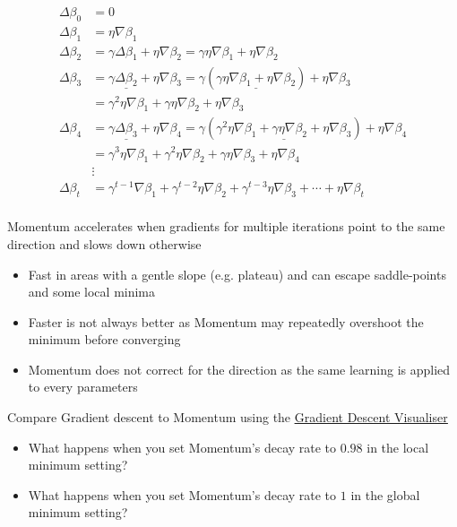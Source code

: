 \documentclass[c]{beamer}
\begin{document}
\begin{frame}{\secsubname}
	\begin{align*}
		\Delta \beta_0 &= 0 \\
		\Delta \beta_1 &= \eta \nabla \beta_1 \\
		\Delta \beta_2 &= \gamma \Delta \beta_1 + \eta \nabla \beta_2 = \gamma \eta \nabla \beta_1 + \eta \nabla \beta_2 \\
		\Delta \beta_3 
		&= \gamma \underline{\Delta \beta_2} + \eta \nabla \beta_3
		= \gamma \left(\underline{\gamma \eta \nabla \beta_1 + \eta \nabla \beta_2}\right) + \eta \nabla \beta_3 \\
		&= \gamma^2 \eta \nabla \beta_1 + \gamma \eta \nabla \beta_2 + \eta \nabla \beta_3 \\
		\Delta \beta_4 
		&= \gamma \underline{\Delta \beta_3} + \eta \nabla \beta_4
		= \gamma \left(\underline{\gamma^2 \eta \nabla \beta_1 + \gamma \eta \nabla \beta_2 + \eta \nabla \beta_3}\right) + \eta \nabla \beta_4 \\
		&= \gamma^3 \eta \nabla \beta_1 + \gamma^2 \eta \nabla \beta_2 + \gamma \eta \nabla \beta_3 + \eta \nabla \beta_4 \\
		&\vdots \\
		\Delta \beta_t &= \gamma^{t-1} \nabla \beta_1 + \gamma^{t-2} \eta \nabla \beta_2 + \gamma^{t-3} \eta \nabla \beta_3 + \cdots + \eta \nabla \beta_t \\
	\end{align*}
\end{frame}

\begin{frame}{\secsubname}
	Momentum accelerates when gradients for multiple iterations point to the same direction and slows down otherwise
	\begin{itemize}
		\item Fast in areas with a gentle slope (e.g. plateau) and can escape saddle-points and some local minima
		\item Faster is not always better as Momentum may repeatedly overshoot the minimum before converging
		\item Momentum does not correct for the direction as the same learning is applied to every parameters
	\end{itemize}
\end{frame}

\begin{frame}[standout]
	\alert{Compare Gradient descent to Momentum using the \href{https://github.com/lilipads/gradient_descent_viz}{\underline{Gradient Descent Visualiser}}} 
	\normalsize \normalfont
	\begin{itemize}
		\item What happens when you set Momentum's decay rate to $0.98$ in the local minimum setting?
		\item What happens when you set Momentum's decay rate to $1$ in the global minimum setting?
	\end{itemize}
\end{frame}
\end{document}

